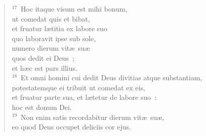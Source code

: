 \begin{flushleft}\begin{verse}${}^{17}$~Hoc itaque visum est mihi bonum,\\ ut comedat quis et bibat,\\ et fruatur l\ae titia ex labore suo\\ quo laboravit ipse sub sole,\\ numero dierum vit\ae\ su\ae \\ quos dedit ei Deus~;\\ et h\ae c est pars illius.\\
${}^{18}$~Et omni homini cui dedit Deus divitias atque substantiam,\\ potestatemque ei tribuit ut comedat ex eis,\\ et fruatur parte sua, et l\ae tetur de labore suo~:\\ hoc est donum Dei.\\
${}^{19}$~Non enim satis recordabitur dierum vit\ae\ su\ae ,\\ eo quod Deus occupet deliciis cor ejus.\end{verse}\end{flushleft}


